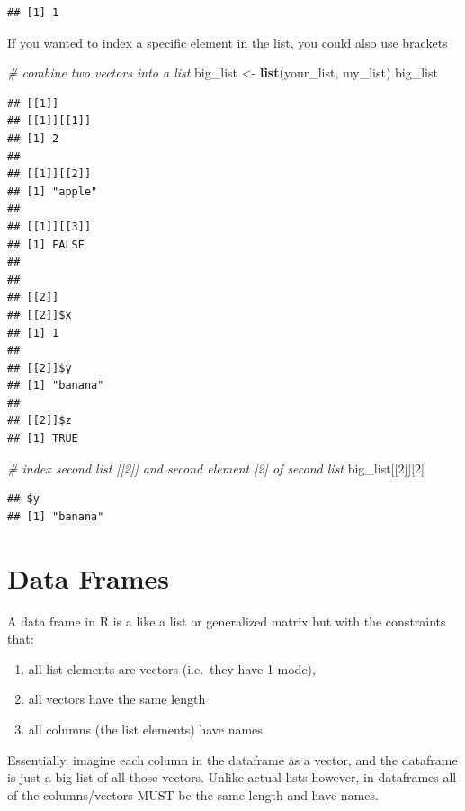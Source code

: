 \documentclass[
]{book}
\newenvironment{Shaded}{\begin{snugshade}}{\end{snugshade}}
\newcommand{\CommentTok}[1]{\textcolor[rgb]{0.56,0.35,0.01}{\textit{#1}}}
\newcommand{\DecValTok}[1]{\textcolor[rgb]{0.00,0.00,0.81}{#1}}
\newcommand{\FunctionTok}[1]{\textcolor[rgb]{0.13,0.29,0.53}{\textbf{#1}}}
\newcommand{\NormalTok}[1]{#1}
\newcommand{\OtherTok}[1]{\textcolor[rgb]{0.56,0.35,0.01}{#1}}
\providecommand{\tightlist}{%
  \setlength{\itemsep}{0pt}\setlength{\parskip}{0pt}}
\begin{document}
\begin{verbatim}
## [1] 1
\end{verbatim}

If you wanted to index a specific element in the list, you could also use brackets

\begin{Shaded}
\begin{Highlighting}[]
\CommentTok{\# combine two vectors into a list}
\NormalTok{big\_list }\OtherTok{\textless{}{-}} \FunctionTok{list}\NormalTok{(your\_list, my\_list)}
\NormalTok{big\_list}
\end{Highlighting}
\end{Shaded}

\begin{verbatim}
## [[1]]
## [[1]][[1]]
## [1] 2
## 
## [[1]][[2]]
## [1] "apple"
## 
## [[1]][[3]]
## [1] FALSE
## 
## 
## [[2]]
## [[2]]$x
## [1] 1
## 
## [[2]]$y
## [1] "banana"
## 
## [[2]]$z
## [1] TRUE
\end{verbatim}

\begin{Shaded}
\begin{Highlighting}[]
\CommentTok{\# index second list [[2]] and second element [2] of second list}
\NormalTok{big\_list[[}\DecValTok{2}\NormalTok{]][}\DecValTok{2}\NormalTok{]}
\end{Highlighting}
\end{Shaded}

\begin{verbatim}
## $y
## [1] "banana"
\end{verbatim}

\section{Data Frames}\label{data-frames}

A data frame in R is a like a list or generalized matrix but with the constraints that:

\begin{enumerate}
\def\labelenumi{(\arabic{enumi})}
\tightlist
\item
  all list elements are vectors (i.e.~they have 1 mode),
\item
  all vectors have the same length
\item
  all columns (the list elements) have names
\end{enumerate}

Essentially, imagine each column in the dataframe as a vector, and the dataframe is just a big list of all those vectors. Unlike actual lists however, in dataframes all of the columns/vectors MUST be the same length and have names.
\end{document}
